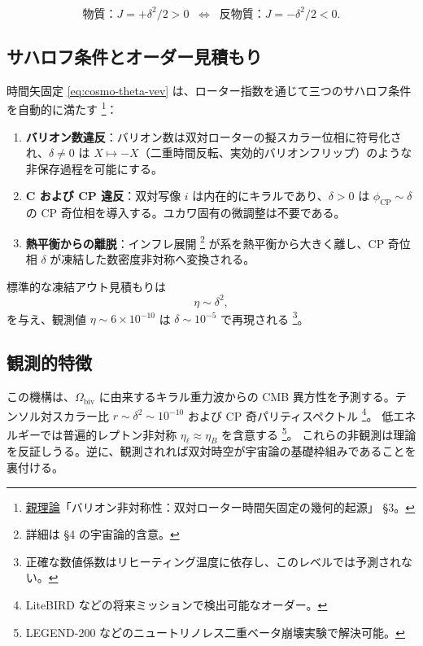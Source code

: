 \documentclass[dvipdfmx,a4paper,oneside]{jsbook}
\numberwithin{equation}{chapter}
\begin{document}
\begin{equation}
  \boxed{\;
  \text{物質：} J = +\delta^2/2 > 0
  \;\;\Longleftrightarrow\;\;
  \text{反物質：} J = -\delta^2/2 < 0.
  \;}
  \label{eq:cosmo-J-split}
\end{equation}

\subsection{サハロフ条件とオーダー見積もり}

時間矢固定 \eqref{eq:cosmo-theta-vev} は、ローター指数を通じて三つのサハロフ条件を自動的に満たす \footnote{\hyperref[sec:sister-manuscripts]{親理論}「バリオン非対称性：双対ローター時間矢固定の幾何的起源」 §3。}：
\begin{enumerate}[leftmargin=2em]
  \item \textbf{バリオン数違反}：バリオン数は双対ローターの擬スカラー位相に符号化され、\(\delta \neq 0\) は \(X \mapsto -X\)（二重時間反転、実効的バリオンフリップ）のような非保存過程を可能にする。
  \item \textbf{C および CP 違反}：双対写像 \(i\) は内在的にキラルであり、\(\delta > 0\) は \(\phi_{\mathrm{CP}} \sim \delta\) の CP 奇位相を導入する。ユカワ固有の微調整は不要である。
  \item \textbf{熱平衡からの離脱}：インフレ展開 \footnote{詳細は §4 の宇宙論的含意。} が系を熱平衡から大きく離し、CP 奇位相 \(\delta\) が凍結した数密度非対称へ変換される。
\end{enumerate}

標準的な凍結アウト見積もりは
\begin{equation}
  \eta \sim \delta^2,
  \label{eq:cosmo-eta-delta}
\end{equation}
を与え、観測値 \(\eta \sim 6 \times 10^{-10}\) は \(\delta \sim 10^{-5}\) で再現される \footnote{正確な数値係数はリヒーティング温度に依存し、このレベルでは予測されない。}。

\subsection{観測的特徴}

この機構は、\(\Omega_{\mathrm{biv}}\) に由来するキラル重力波からの CMB 異方性を予測する。テンソル対スカラー比 \(r \sim \delta^2 \sim 10^{-10}\) および CP 奇パリティスペクトル \footnote{LiteBIRD などの将来ミッションで検出可能なオーダー。}。
低エネルギーでは普遍的レプトン非対称 \(\eta_\ell \approx \eta_B\) を含意する \footnote{LEGEND-200 などのニュートリノレス二重ベータ崩壊実験で解決可能。}。
これらの非観測は理論を反証しうる。逆に、観測されれば双対時空が宇宙論の基礎枠組みであることを裏付ける。
\end{document}
